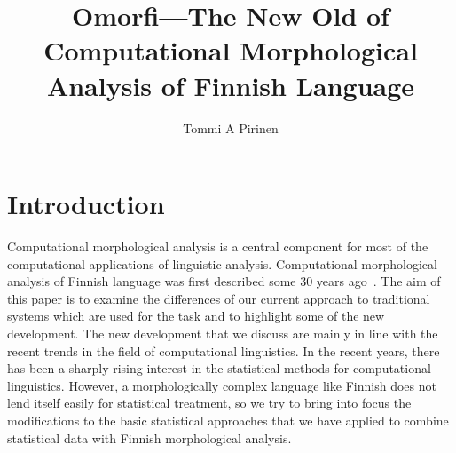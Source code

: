 \documentclass[a4paper,12pt]{article}
\title{Omorfi---The New Old of Computational Morphological Analysis of Finnish
Language}
\author{Tommi A Pirinen}
\date{}
\begin{document}
\maketitle
\iffalse
\begin{abstract}

    This squib describes a contemporary system for computational analysis of
    morphology of Finnish word-forms. The system we present is at its core a
    finite-state morphology, just like other popular systems for computational
    Finnish morphology have been since 1983.  The purpose of this squib is to
    describe the key differences and new approaches improving the previous
    versions of the analysers. Firstly an extended classification was made nto
    accommodate computational semi-automatic classification of new words and
    fine-tune the inflectional variants, and to systematically go through the
    synchronic variations in morphophonology of Finnish on the grapheme level.
    Secondly we pursue some of the recent developments in the field of
    statistical computational linguistics.  We show how we have adapted
    statistical approaches into a traditional rule-based approach that was used
    with Finnish morphology. Thirdly, our system is based fully on free and
    open source systems and approaches. A practical benefit of this approach is
    shown with the use of crowd-sourced dictionary Wiktionary as one additional
    of lexical data.  To evaluate our analyser, we have analysed large text
    corpora on the system and verified that only 1~\% of the word-forms remains
    unknown to the system.  We have also made some rudimentary quality and
    speed comparisons against results of the systems currently in use to show
    that we have a faster system that still recreates the main results of other
    systems faithfully if needed.

\end{abstract}
\fi
\section{Introduction}

Computational morphological analysis is a central component for most of the
computational applications of linguistic analysis. Computational morphological
analysis of Finnish language was first described some 30 years
ago~\citep{koskenniemi1983twolevel}. The aim of this paper is to examine the
differences of our current approach to traditional systems which are used for
the task and to highlight some of the new development. The new development that
we discuss are mainly in line with the recent trends in the field of
computational linguistics. In the recent years, there has been a sharply rising
interest in the statistical methods for computational linguistics. However, a
morphologically complex language like Finnish does not lend itself easily for
statistical treatment, so we try to bring into focus the modifications to the
basic statistical approaches that we have applied to combine statistical data
with Finnish morphological analysis.
\end{document}
